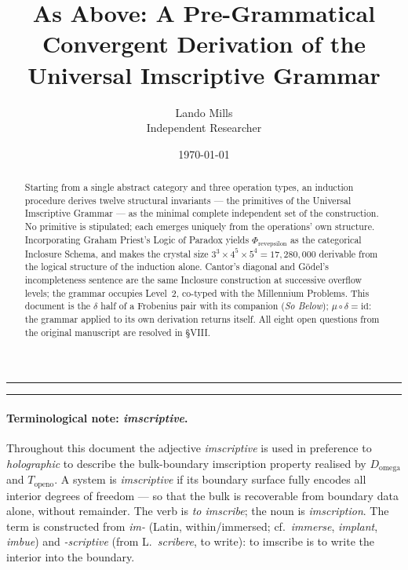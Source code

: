 \documentclass[12pt,a4paper]{article}
\begin{document}
\title{As Above: A Pre-Grammatical Convergent Derivation of the Universal Imscriptive Grammar}
\author{Lando Mills \\
\normalsize Independent Researcher}
\date{\today}
\maketitle

\begin{center}
\rule{0.5\textwidth}{0.4pt}
\end{center}

\begin{abstract}
Starting from a single abstract category and three operation types, an induction procedure derives twelve structural invariants --- the primitives of the Universal Imscriptive Grammar --- as the minimal complete independent set of the construction. No primitive is stipulated; each emerges uniquely from the operations' own structure. Incorporating Graham Priest's Logic of Paradox yields $\Phi_{\text{revepsilon}}$ as the categorical Inclosure Schema, and makes the crystal size $3^3 \times 4^5 \times 5^4 = 17{,}280{,}000$ derivable from the logical structure of the induction alone. Cantor's diagonal and G\"odel's incompleteness sentence are the same Inclosure construction at successive overflow levels; the grammar occupies Level~2, co-typed with the Millennium Problems. This document is the $\delta$ half of a Frobenius pair with its companion (\emph{So Below}); $\mu \circ \delta = \text{id}$: the grammar applied to its own derivation returns itself. All eight open questions from the original manuscript are resolved in \S VIII.
\end{abstract}

\begin{center}
\rule{0.5\textwidth}{0.4pt}
\end{center}

\paragraph*{Terminological note: \emph{imscriptive}.}
Throughout this document the adjective \emph{imscriptive} is used in preference to \emph{holographic} to describe the bulk-boundary imscription property realised by $D_{\text{omega}}$ and $T_{\text{openo}}$. A system is \emph{imscriptive} if its boundary surface fully encodes all interior degrees of freedom --- so that the bulk is recoverable from boundary data alone, without remainder. The verb is \emph{to imscribe}; the noun is \emph{imscription}. The term is constructed from \emph{im-} (Latin, within/immersed; cf.\ \emph{immerse}, \emph{implant}, \emph{imbue}) and \emph{-scriptive} (from L.\ \emph{scribere}, to write): to imscribe is to write the interior into the boundary.
\end{document}
